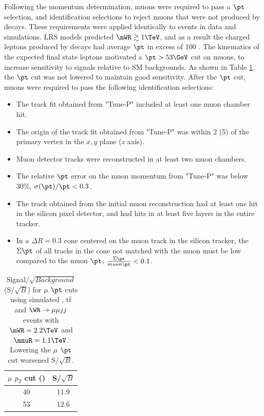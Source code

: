 Following the momentum determination, muons were required to pass a $\pt$ selection, and 
identification selections to reject muons that were not produced by \WR decays.  These requirements were applied identically to events 
in data and simulations.  LRS models predicted $\mWR \gtrsim 1 \TeV$, and as a result the charged leptons 
produced by \WR decays had average $\pt$ in excess of 100 \GeV.  The kinematics of the expected final state leptons 
motivated a $\pt > 53 \GeV$ cut on muons, to increase sensitivity to \WR signals relative to SM backgrounds.  
As shown in Table \ref{tab:lowerMuonPtCuts}, the $\pt$ cut was not lowered to maintain good \WR sensitivity.  After the $\pt$ cut, muons 
were required to pass the following identification selections:

\begin{itemize}
	\item The track fit obtained from "Tune-P" included at least one muon chamber hit.
	\item The origin of the track fit obtained from "Tune-P" was within 2 (5) \mm of the primary vertex in the $x,y$ plane ($z$ axis).
	\item Muon detector tracks were reconstructed in at least two muon chambers.
	\item The relative $\pt$ error on the muon momentum from "Tune-P" was below 30\%, $\sigma(\pt)/\pt < 0.3$.
	\item The track obtained from the initial muon reconstruction had at least one hit in the silicon pixel detector, and had 
		hits in at least five layers in the entire tracker.
	\item In a $\Delta R = 0.3$ cone centered on the muon track in the silicon tracker, the $\Sigma \pt$ of all 
		tracks in the cone not matched with the muon must be low compared to the muon $\pt$, $\frac{\Sigma \pt}{muon \pt} < 0.1$.
\end{itemize}

\begin{table}[h]
	\caption{Signal/$\sqrt{Background}$ (S/$\sqrt{B}$) for $\mu$ $\pt$ 
	cuts using simulated \DY, t$\bar{t}$ and $\WR \rightarrow \mu\mu jj$ events with $\mWR = 2.2 \TeV$ and $\mnuR = 1.1 \TeV$.  
Lowering the $\mu$ $\pt$ cut worsened S/$\sqrt{B}$.}
	\label{tab:lowerMuonPtCuts}
	\centering
	\begin{tabular}{c|c}
		$\mu$ $p_{T}$ cut (\GeV) & S/$\sqrt{B}$ \\  \hline
		40 &  11.9  \\
		53 &  12.6  \\ \hline
	\end{tabular}
\end{table}

